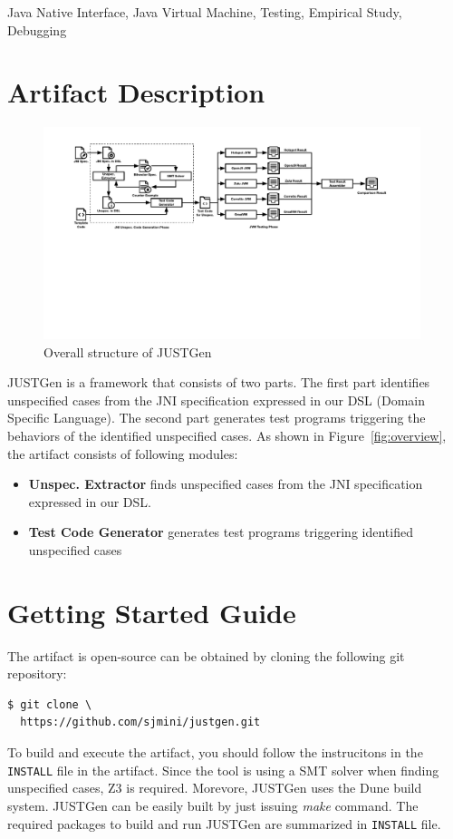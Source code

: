 \documentclass[conference]{IEEEtran}
\begin{document}
\begin{IEEEkeywords}
Java Native Interface, Java Virtual Machine, Testing, Empirical Study, Debugging
\end{IEEEkeywords}

\section{Artifact Description}

\begin{figure}
  \includegraphics[width=0.98\textwidth]{dsl_overview5.pdf}
  \caption{Overall structure of JUSTGen}
  \label{fig:overall}
\end{figure}

JUSTGen is a framework that consists of two parts. The first part identifies 
unspecified cases from the JNI specification expressed in our DSL (Domain Specific Language). 
The second part generates test programs triggering the behaviors of the identified unspecified cases. 
As shown in Figure~\ref{fig:overview}, the artifact consists of following modules:

\begin{itemize}
  \item \textbf{Unspec. Extractor} finds unspecified cases from the JNI specification expressed in our DSL. 
  \item \textbf{Test Code Generator} generates test programs triggering identified unspecified cases
  
\end{itemize}

\section{Getting Started Guide}

The artifact is open-source can be obtained by cloning the following git
repository:
\begin{lstlisting}
$ git clone \ 
  https://github.com/sjmini/justgen.git 
\end{lstlisting}
To build and execute the artifact, you should follow the instrucitons in the
\texttt{INSTALL} file in the artifact. 
Since the tool is using a SMT solver when finding unspecified cases, Z3 is required.
Morevore, JUSTGen uses the Dune build system. 
JUSTGen can be easily built by just issuing \textit{make} command.
The required packages to build and run JUSTGen are summarized in \texttt{INSTALL} file.
\end{document}
